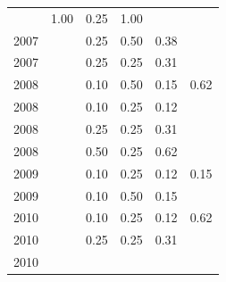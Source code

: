 \begin{table}[H]
\begin{tabular}{| l | c | c | c | c | c |}
          &
          1.00
          &
          0.25
          &
          1.00
          &
          \\
            2007
          &
          
          &
          0.25
          &
          0.50
          &
          0.38
          &
          \\
            2007
          &
          
          &
          0.25
          &
          0.25
          &
          0.31
          &
          \\
\hline
            2008
          &
          
          &
          0.10
          &
          0.50
          &
          0.15
          &
            {\color{blue} 0.62}
          \\
            2008
          &
          
          &
          0.10
          &
          0.25
          &
          0.12
          &
          \\
            2008
          &
          
          &
          0.25
          &
          0.25
          &
          0.31
          &
          \\
            2008
          &
          
          &
          0.50
          &
          0.25
          &
          0.62
          &
          \\
\hline
            2009
          &
          
          &
          0.10
          &
          0.25
          &
          0.12
          &
            {\color{red} 0.15}
          \\
            2009
          &
          
          &
          0.10
          &
          0.50
          &
          0.15
          &
          \\
\hline
            2010
          &
          
          &
          0.10
          &
          0.25
          &
          0.12
          &
            {\color{blue} 0.62}
          \\
            2010
          &
          
          &
          0.25
          &
          0.25
          &
          0.31
          &
          \\
            2010
          &
          

\end{tabular}
\end{table}

